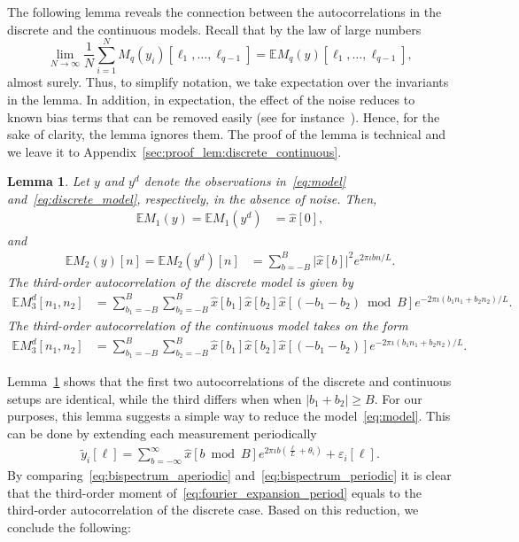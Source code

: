 \documentclass[english,12pt]{article}
\newcommand{\I}{\iota}
\newcommand{\tB}{B}
\newcommand{\E}{\mathbb{E}}
\numberwithin{equation}{section}
\numberwithin{thm}{section} %
\newtheorem{lemma}[thm]{Lemma}
\begin{document}
The following lemma reveals the connection between the autocorrelations in the discrete and the continuous models. 
Recall that 
by the law of large numbers 
\begin{equation}
\lim_{N\to\infty}\frac{1}{N}\sum_{i=1}^NM_q(y_i)[\ell_1,\ldots,\ell_{q-1}]
=\E M_q(y)[\ell_1,\ldots,\ell_{q-1}], 
\end{equation}
almost surely. 
Thus, to simplify notation, we take expectation over the invariants in the lemma. In addition, in expectation, the effect of the noise reduces to known bias terms that can be removed easily (see for instance~\cite{bendory2017bispectrum}). Hence, for the sake of clarity, the lemma ignores them.
The proof of the lemma is technical and we leave it to Appendix~\ref{sec:proof_lem:discrete_continuous}.
\begin{lemma} \label{lem:discrete_continuous}
Let $y$ and $y^d$ denote the observations in~\eqref{eq:model} and~\eqref{eq:discrete_model}, respectively, in the absence of noise. 
Then, 
\begin{align}
\E M_1(y) = \E M_1(y^d) &= \hat{x}[0],
\end{align}
and
\begin{align} \label{eq:power_spectrum_discrete}
\E M_2(y)[n] = \E M_2(y^d)[n] &= \sum_{b=-\tB}^{\tB}\vert \hat{x}[b]\vert ^2e^{2\pi\I bn/L}.
\end{align}
The third-order autocorrelation of the  discrete model is given by 
\begin{align} \label{eq:bispectrum_periodic}
\E M_3^d[n_1,n_2] &= \sum_{b_1=-\tB}^{\tB}\sum_{b_2=-\tB}^{\tB}\hat{x}[b_1]\hat{x}[b_2]\hat{x}[(-b_1-b_2)\bmod B]e^{-2\pi\I (b_1n_1 + b_2n_2)/L}.
\end{align}
The third-order autocorrelation of the continuous model takes on the form 
\begin{align} \label{eq:bispectrum_aperiodic}
\E M_3^d[n_1,n_2] &= \sum_{b_1=-\tB}^{\tB}\sum_{b_2=-\tB}^{\tB}\hat{x}[b_1]\hat{x}[b_2]\hat{x}[(-b_1-b_2)]e^{-2\pi\I (b_1n_1 + b_2n_2)/L}.
\end{align}
\end{lemma}

Lemma~\ref{lem:discrete_continuous} shows that the first two autocorrelations of the discrete and continuous setups are identical, while the third differs when when $|b_1+b_2|\geq\tB$.
For our purposes, this lemma suggests a simple way to reduce the model~\eqref{eq:model}. This can be done by extending each measurement periodically 
\begin{eqnarray} \label{eq:fourier_expansion_period}
\tilde{y}_i[\ell] = \sum_{b=-\infty}^{\infty}\hat{x}[b\bmod B]e^{2\pi\I b\left(\frac{\ell}{L}+\theta_i\right) }+ \varepsilon_i[\ell].
\end{eqnarray}
By comparing~\eqref{eq:bispectrum_aperiodic} and~\eqref{eq:bispectrum_periodic} it is clear that the third-order moment of~\ref{eq:fourier_expansion_period} equals to the third-order autocorrelation of the discrete case. Based on this reduction, we conclude the following:
\end{document}
